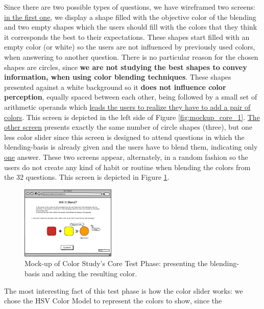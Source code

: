 %
Since there are two possible types of questions, we have wireframed two screens: \ul{in the first one}, we display a shape filled with the objective color of the
blending and two empty shapes which the users should fill with the colors that they think it corresponds the best to their expectations. These shapes start filled
with an empty color (or white) so the users are not influenced by previously used colors, when answering to another question. There is no particular reason for
the chosen shapes are circles, since \textbf{we are not studying the best shapes to convey information, when using color blending techniques}. These
shapes presented against a white background so it \textbf{does not influence color perception}, equally spaced between each other, being followed by a small
set of arithmetic operands which \ul{leads the users to realize they have to add a pair of colors}. This screen is depicted in the left side of Figure
\ref{fig:mockup_core_1}. \ul{The other screen} presents exactly the same number of circle shapes (three), but one less color slider since this screen is designed to attend questions in
which the blending-basis is already given and the users have to blend them, indicating only \ul{one} answer. These two screens appear, alternately, in a random
fashion so the users do not create any kind of habit or routine when blending the colors from the 32 questions. This screen is depicted in Figure
\ref{fig:mockup_core_2}. \par
%
\begin{figure}
	\centering
	\vspace{-15pt}
  \includegraphics[width=0.4\textwidth]{images/implementation/mockup_core_twoColorsObj.png}
  \caption[Mock-up of Color Study's Core Test Phase: present the blending-basis and ask the result.]{Mock-up of Color Study's Core
	Test Phase: presenting the blending-basis and asking the resulting color.}
  \label{fig:mockup_core_2}
\end{figure}
%
The most interesting fact of this test phase is how the color slider works: we chose the HSV Color Model to represent the colors to show, since the
